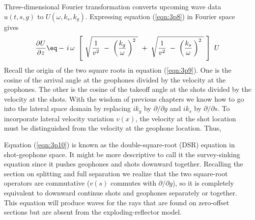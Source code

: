 \par
Three-dimensional Fourier transformation converts
upcoming wave data  $u(t,s,g)$  to  $U( \omega , k_s , k_g )$.
Expressing equation (\ref{eqn:3p8}) in Fourier space gives
\begin{equation}
{ \partial U   \over  \partial z } \eq -\,i\,\omega \  \left[ \  
\sqrt{ {1 \over  v^2 } \ -\  \left( { k_g 
\over \omega }\, \right)^2 \  } \ +\  \sqrt{{1 \over  v^2 } \ -\  \left(
{ k_s   \over \omega }\, \right)^2 \  } \ \right] \  U
\label{eqn:3p9}
\end{equation}
Recall the origin of the two square roots in equation (\ref{eqn:3p9}).
One is the cosine of the arrival angle at the geophones
divided by the velocity at the geophones.
The other is the cosine of the takeoff angle at the shots
divided by the velocity at the shots.
With the wisdom of previous chapters
we know how to go into the lateral space domain by
replacing  $i k_g$  by  $\partial / \partial g$  and
$i k_s$  by  $\partial / \partial s$.
To incorporate lateral velocity variation  $v(x)$,
the velocity at the shot location must be distinguished
from the velocity at the geophone location.
Thus,
\par
\boxit{
	\begin{equation}
	{ \partial U   \over  \partial z }  \eq  
	\left[ \   \sqrt{\   \left( \ 
	{-\,i \omega\   \over v (g)} \, \right)^2 -\ 
	{\partial^2 \   \over \partial g^2} \, } \ +\  
	 \sqrt{\  \left( {-\,i \omega\   \over v (s)} \, \right)^2 -\ 
	{\partial^2 \   \over \partial s^2} \, } \  \right] \  U
	\label{eqn:3p10}
	\end{equation}
	}

\par
Equation (\ref{eqn:3p10}) is known as
the double-square-root (DSR) equation in shot-geophone space.
It might be more descriptive to call it the survey-sinking equation
since it pushes geophones and shots downward together.
Recalling the section on splitting and full separation
we realize that the two square-root operators are commutative
($v(s)$  commutes with  $ \partial / \partial g $),
so it is completely equivalent
to downward continue shots and geophones separately or together.
This equation will produce waves for the rays
that are found on zero-offset sections
but are absent
from the exploding-reflector model.
